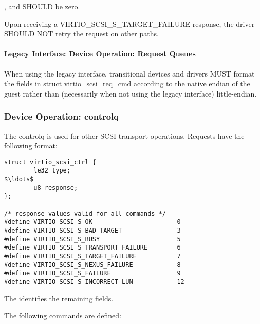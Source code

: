 
,  and  SHOULD be zero.

Upon receiving a VIRTIO_SCSI_S_TARGET_FAILURE response, the driver
SHOULD NOT retry the request on other paths.

\paragraph{Legacy Interface: Device Operation: Request Queues}\label{sec:Device Types / SCSI Host Device / Device Operation / Device Operation: Request Queues / Legacy Interface: Device Operation: Request Queues}
When using the legacy interface, transitional devices and drivers
MUST format the fields in struct virtio_scsi_req_cmd
according to the native endian of the guest rather than
(necessarily when not using the legacy interface) little-endian.

\subsubsection{Device Operation: controlq}\label{sec:Device Types / SCSI Host Device / Device Operation / Device Operation: controlq}

The controlq is used for other SCSI transport operations.
Requests have the following format:

{
\lstset{escapechar=\$}
\begin{lstlisting}
struct virtio_scsi_ctrl {
        le32 type;
$\ldots$
        u8 response;
};

/* response values valid for all commands */
#define VIRTIO_SCSI_S_OK                       0
#define VIRTIO_SCSI_S_BAD_TARGET               3
#define VIRTIO_SCSI_S_BUSY                     5
#define VIRTIO_SCSI_S_TRANSPORT_FAILURE        6
#define VIRTIO_SCSI_S_TARGET_FAILURE           7
#define VIRTIO_SCSI_S_NEXUS_FAILURE            8
#define VIRTIO_SCSI_S_FAILURE                  9
#define VIRTIO_SCSI_S_INCORRECT_LUN            12
\end{lstlisting}
}

The  identifies the remaining fields.

The following commands are defined:

